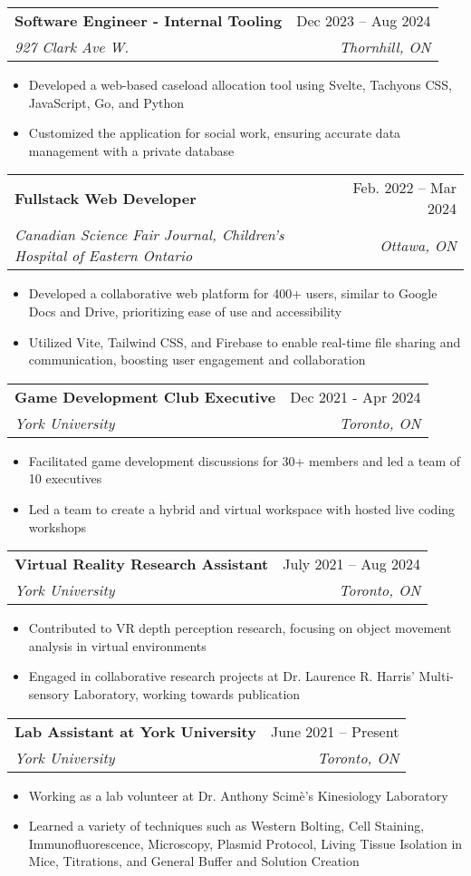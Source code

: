 \documentclass[letterpaper,11pt]{article}
\makeatletter
\newcommand{\resumeItem}[1]{
  \item\small{
    {#1 \vspace{-2pt}}
  }
}
\newcommand{\resumeSubheading}[4]{
  \vspace{-2pt}\item
    \begin{tabular*}{0.97\textwidth}[t]{l@{\extracolsep{\fill}}r}
      \textbf{#1} & #2 \\
      \textit{\small#3} & \textit{\small #4} \\
    \end{tabular*}\vspace{-7pt}
}
\newcommand{\resumeItemListStart}{\begin{itemize}}
\newcommand{\resumeItemListEnd}{\end{itemize}\vspace{-5pt}}
\makeatother
\begin{document}
        
    \resumeSubheading
      {Software Engineer - Internal Tooling}{Dec 2023 -- Aug 2024}
      {927 Clark Ave W.}{Thornhill, ON}
      \resumeItemListStart
        \resumeItem{Developed a web-based caseload allocation tool using Svelte, Tachyons CSS, JavaScript, Go, and Python}
        \resumeItem{Customized the application for social work, ensuring accurate data management with a private database}
    \resumeItemListEnd
        
    \resumeSubheading
      {Fullstack Web Developer}{Feb. 2022 -- Mar 2024}
      {Canadian Science Fair Journal, Children’s Hospital of Eastern Ontario}{Ottawa, ON}
      \resumeItemListStart
        \resumeItem{Developed a collaborative web platform for 400+ users, similar to Google Docs and Drive, prioritizing ease of use and accessibility}
        \resumeItem{Utilized Vite, Tailwind CSS, and Firebase to enable real-time file sharing and communication, boosting user engagement and collaboration}
      \resumeItemListEnd
    
    

    

    \resumeSubheading
      {Game Development Club Executive}{Dec 2021 - Apr 2024}     
      {York University}{Toronto, ON}
      \resumeItemListStart
        \resumeItem{Facilitated game development discussions for 30+ members and led a team of 10 executives}
        \resumeItem{Led a team to create a hybrid and virtual workspace with hosted live coding workshops}
    \resumeItemListEnd
    
    \resumeSubheading
      {Virtual Reality Research Assistant}{July 2021 -- Aug 2024}
      {York University}{Toronto, ON}
      \resumeItemListStart
        \resumeItem{Contributed to VR depth perception research, focusing on object movement analysis in virtual environments}
        \resumeItem{Engaged in collaborative research projects at Dr. Laurence R. Harris' Multi-sensory Laboratory, working towards publication}
    \resumeItemListEnd

    
    \resumeSubheading
      {Lab Assistant at York University}{June 2021 -- Present}
      {York University}{Toronto, ON}
      \resumeItemListStart
        \resumeItem{Working as a lab volunteer at Dr. Anthony Scimè's Kinesiology Laboratory}
        \resumeItem{Learned a variety of techniques such as Western Bolting, Cell Staining, Immunofluorescence, Microscopy, Plasmid Protocol, Living Tissue Isolation in Mice, Titrations, and General Buffer and Solution Creation }
    \resumeItemListEnd
    
\end{document}
